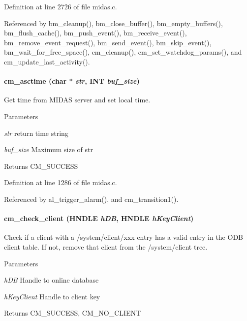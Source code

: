 Definition at line 2726 of file midas.c.

Referenced by bm\_\-cleanup(), bm\_\-close\_\-buffer(), bm\_\-empty\_\-buffers(), bm\_\-flush\_\-cache(), bm\_\-push\_\-event(), bm\_\-receive\_\-event(), bm\_\-remove\_\-event\_\-request(), bm\_\-send\_\-event(), bm\_\-skip\_\-event(), bm\_\-wait\_\-for\_\-free\_\-space(), cm\_\-cleanup(), cm\_\-set\_\-watchdog\_\-params(), and cm\_\-update\_\-last\_\-activity().
\paragraph[{cm\_\-asctime}]{ cm\_\-asctime (char $\ast$ {\em str}, \/  {\bf INT} {\em buf\_\-size})}\hfill\label{group__cmfunctionc_gac340cbe250a502de8befa8c0beeac945}
Get time from MIDAS server and set local time. 
\begin{DoxyParams}{Parameters}
\item[{\em str}]return time string \item[{\em buf\_\-size}]Maximum size of str \end{DoxyParams}
\begin{DoxyReturn}{Returns}
CM\_\-SUCCESS 
\end{DoxyReturn}


Definition at line 1286 of file midas.c.

Referenced by al\_\-trigger\_\-alarm(), and cm\_\-transition1().
\paragraph[{cm\_\-check\_\-client}]{ cm\_\-check\_\-client (HNDLE {\em hDB}, \/  HNDLE {\em hKeyClient})}\hfill\label{group__cmfunctionc_ga43f5554b3e5296a0f92ec3d6aa15ed30}
Check if a client with a /system/client/xxx entry has a valid entry in the ODB client table. If not, remove that client from the /system/client tree. 
\begin{DoxyParams}{Parameters}
\item[{\em hDB}]Handle to online database \item[{\em hKeyClient}]Handle to client key \end{DoxyParams}
\begin{DoxyReturn}{Returns}
CM\_\-SUCCESS, CM\_\-NO\_\-CLIENT 
\end{DoxyReturn}



